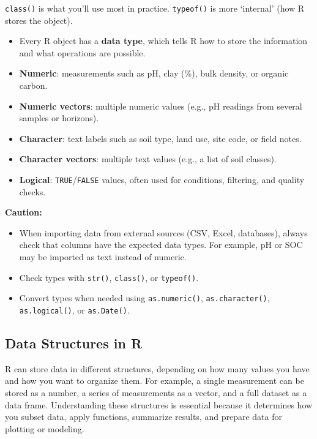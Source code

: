 \documentclass[
  10pt,
  b5paper,
  oneside]{book}
\begin{document}
\texttt{class()} is what you'll use most in practice. \texttt{typeof()} is more `internal' (how R stores the object).

\begin{itemize}
\item
  Every R object has a \textbf{data type}, which tells R how to store the information and what operations are possible.
\item
  \textbf{Numeric}: measurements such as pH, clay (\%), bulk density, or organic carbon.
\item
  \textbf{Numeric vectors}: multiple numeric values (e.g., pH readings from several samples or horizons).
\item
  \textbf{Character}: text labels such as soil type, land use, site code, or field notes.
\item
  \textbf{Character vectors}: multiple text values (e.g., a list of soil classes).
\item
  \textbf{Logical}: \texttt{TRUE}/\texttt{FALSE} values, often used for conditions, filtering, and quality checks.
\end{itemize}

\textbf{Caution:}

\begin{itemize}
\item
  When importing data from external sources (CSV, Excel, databases), always check that columns have the expected data types. For example, pH or SOC may be imported as text instead of numeric.
\item
  Check types with \texttt{str()}, \texttt{class()}, or \texttt{typeof()}.
\item
  Convert types when needed using \texttt{as.numeric()}, \texttt{as.character()}, \texttt{as.logical()}, or \texttt{as.Date()}.
\end{itemize}

\subsection{Data Structures in R}\label{structure-data}

R can store data in different structures, depending on how many values you have and how you want to organize them. For example, a single measurement can be stored as a number, a series of measurements as a vector, and a full dataset as a data frame. Understanding these structures is essential because it determines how you subset data, apply functions, summarize results, and prepare data for plotting or modeling.
\end{document}
